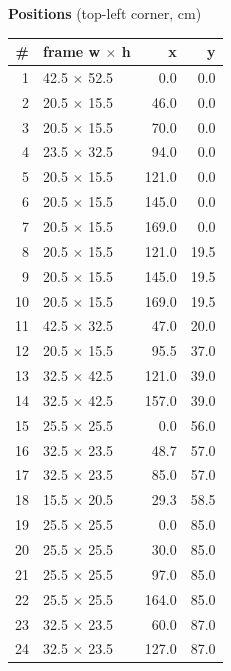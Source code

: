 \documentclass[a4paper,landscape,10pt]{article}
\begin{document}
\begin{minipage}[t]{0.25\textwidth}
\vspace{8pt}
{\bfseries Positions} (top-left corner, cm)\\[2pt]
\tiny
\begin{tabular}{@{}r l r r@{}}
\toprule
\# & frame w $\times$ h & x & y \\
\midrule
1 & 42.5 $\times$ 52.5 & 0.0 & 0.0 \\
2 & 20.5 $\times$ 15.5 & 46.0 & 0.0 \\
3 & 20.5 $\times$ 15.5 & 70.0 & 0.0 \\
4 & 23.5 $\times$ 32.5 & 94.0 & 0.0 \\
5 & 20.5 $\times$ 15.5 & 121.0 & 0.0 \\
6 & 20.5 $\times$ 15.5 & 145.0 & 0.0 \\
7 & 20.5 $\times$ 15.5 & 169.0 & 0.0 \\
8 & 20.5 $\times$ 15.5 & 121.0 & 19.5 \\
9 & 20.5 $\times$ 15.5 & 145.0 & 19.5 \\
10 & 20.5 $\times$ 15.5 & 169.0 & 19.5 \\
11 & 42.5 $\times$ 32.5 & 47.0 & 20.0 \\
12 & 20.5 $\times$ 15.5 & 95.5 & 37.0 \\
13 & 32.5 $\times$ 42.5 & 121.0 & 39.0 \\
14 & 32.5 $\times$ 42.5 & 157.0 & 39.0 \\
15 & 25.5 $\times$ 25.5 & 0.0 & 56.0 \\
16 & 32.5 $\times$ 23.5 & 48.7 & 57.0 \\
17 & 32.5 $\times$ 23.5 & 85.0 & 57.0 \\
18 & 15.5 $\times$ 20.5 & 29.3 & 58.5 \\
19 & 25.5 $\times$ 25.5 & 0.0 & 85.0 \\
20 & 25.5 $\times$ 25.5 & 30.0 & 85.0 \\
21 & 25.5 $\times$ 25.5 & 97.0 & 85.0 \\
22 & 25.5 $\times$ 25.5 & 164.0 & 85.0 \\
23 & 32.5 $\times$ 23.5 & 60.0 & 87.0 \\
24 & 32.5 $\times$ 23.5 & 127.0 & 87.0 \\
\bottomrule
\end{tabular}
\end{minipage}
\clearpage
\end{document}
